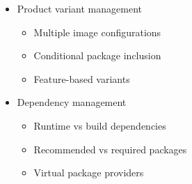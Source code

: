 \documentclass[
]{article}
\providecommand{\tightlist}{%
  \setlength{\itemsep}{0pt}\setlength{\parskip}{0pt}}
\begin{document}
\begin{itemize}
\begin{itemize}
\begin{itemize}
      \begin{itemize}
      \tightlist
      \item
        Package group recipes
      \item
        Task packages
      \item
        Meta packages
      \end{itemize}
    \item
      Product variant management

      \begin{itemize}
      \tightlist
      \item
        Multiple image configurations
      \item
        Conditional package inclusion
      \item
        Feature-based variants
      \end{itemize}
    \item
      Dependency management

      \begin{itemize}
      \tightlist
      \item
        Runtime vs build dependencies
      \item
        Recommended vs required packages
      \item
        Virtual package providers
      \end{itemize}
    \end{itemize}
  \end{itemize}
\end{itemize}
\end{document}

